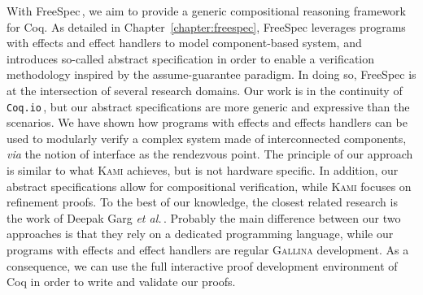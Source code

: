 With FreeSpec\,\cite{letan2018freespeccode}, we aim to provide a generic
compositional reasoning framework for Coq.
%
As detailed in Chapter~\ref{chapter:freespec}, FreeSpec leverages programs with
effects and effect handlers to model component-based system, and introduces
so-called abstract specification in order to enable a verification methodology
inspired by the assume-guarantee paradigm.
%
In doing so, FreeSpec is at the intersection of several research domains.
%
Our work is in the continuity of \texttt{Coq.io}\,\cite{claret2015coqio}, but
our abstract specifications are more generic and expressive than the scenarios.
%
We have shown how programs with effects and effects handlers can be used to
modularly verify a complex system made of interconnected components, \emph{via}
the notion of interface as the rendezvous point.
%
The principle of our approach is similar to what {\scshape Kami} achieves, but
is not hardware specific.
%
In addition, our abstract specifications allow for compositional verification,
while {\scshape Kami} focuses on refinement proofs.
%
To the best of our knowledge, the closest related research is the work of Deepak
Garg \emph{et al.}\,\cite{garg2010compositional}.
%
Probably the main difference between our two approaches is that they rely on a
dedicated programming language, while our programs with effects and effect
handlers are regular {\scshape Gallina} development.
%
As a consequence, we can use the full interactive proof development environment
of Coq in order to write and validate our proofs.
